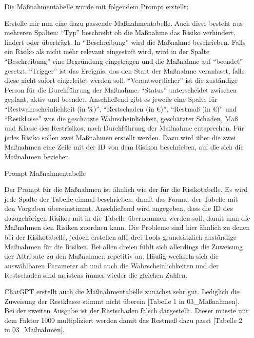 Die Maßnahmentabelle wurde mit folgendem Prompt erstellt:

\begin{prompt}[H]
    \begin{tcolorbox}[colback=gray!20, colframe=gray!20, boxrule=0pt, sharp corners] 
        Erstelle mir nun eine dazu passende Maßnahmentabelle. Auch diese besteht aus mehreren Spalten: ``Typ'' beschreibt 
        ob die Maßnahme das Risiko verhindert, lindert oder überträgt. In ``Beschreibung'' wird die Maßnahme beschrieben. 
        Falls ein Risiko als nicht mehr relevant eingestuft wird, wird in der Spalte ``Beschreibung'' eine Begründung 
        eingetragen und die Maßnahme auf ``beendet'' gesetzt. ``Trigger'' ist das Ereignis, das den Start der Maßnahme 
        veranlasst, falls diese nicht sofort eingeleitet werden soll. ``Verantwortlicher'' ist die zuständige Person für 
        die Durchführung der Maßnahme. ``Status'' unterscheidet zwischen geplant, aktiv und beendet. Anschließend gibt es 
        jeweils eine Spalte für ``Restwahrscheinlichkeit (in \%)'', ``Restschaden (in €)'', ``Restmaß (in €)'' und ``Restklasse'' 
        was die geschätzte Wahrscheinlichkeit, geschätzter Schaden, Maß und Klasse des Restrisikos, nach Durchführung der 
        Maßnahme entsprechen. Für jedes Risiko sollen zwei Maßnahmen erstellt werden. Dazu wird über die zwei Maßnahmen 
        eine Zeile mit der ID von dem Risikon beschrieben, auf die sich die Maßnahmen beziehen.
        \vfill
    \end{tcolorbox}
    \caption{Prompt Maßnahmentabelle}
    \label{Prompt Maßnahmentabelle}
\end{prompt}

Der Prompt für die Maßnahmen ist ähnlich wie der für die Risikotabelle. Es wird jede Spalte der Tabelle einmal beschrieben,
damit das Format der Tabelle mit den Vorgaben übereinstimmt. Anschließend wird angegeben, dass die ID des dazugehörigen Risikos
mit in die Tabelle übernommen werden soll, damit man die Maßnahmen den Risiken zuordnen kann. Die Probleme sind hier 
ähnlich zu denen bei der Risikotabelle, jedoch erstellen alle drei Tools grundsätzlich anständige Maßnahmen für die Risiken.
Bei allen dreien fühlt sich allerdings die Zuweisung der Attribute zu den Maßnahmen repetitiv an. Häufig wechseln sich die 
auswählbaren Parameter ab und auch die Wahrscheinlichkeiten und der Restschaden sind meistens immer wieder die gleichen Zahlen.

ChatGPT erstellt auch die Maßnahmentabelle zunächst sehr gut. Lediglich die Zuweisung der Restklasse stimmt nicht überein 
[Tabelle 1 in 03\_Maßnahmen]. Bei der zweiten Ausgabe ist der Restschaden falsch dargestellt. Dieser müsste mit dem Faktor 
1000 multipliziert werden damit das Restmaß dazu passt [Tabelle 2 in 03\_Maßnahmen].

